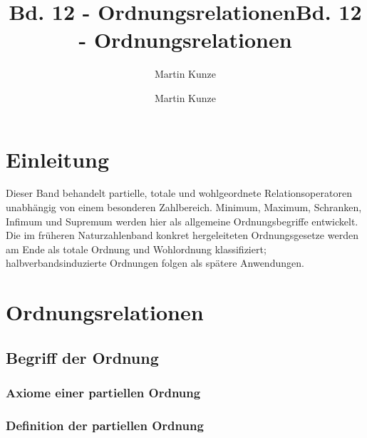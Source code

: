 \documentclass[main.tex]{subfiles}
\title{Bd. 12 - Ordnungsrelationen}
\author{Martin Kunze}
\date{}
\begin{document}
\title{Bd. 12 - Ordnungsrelationen}
\author{Martin Kunze}
\date{}
\hypersetup{pageanchor=false}
\maketitle
\hypersetup{pageanchor=true}
\setcounter{tocdepth}{3}
\tableofcontents
\setcounter{file}{12}
\renewcommand{\FormulaBandID}{12}
\providecommand{\ProofRefStack}[1]{%
  \ensuremath{\begin{gathered}#1\end{gathered}}}

\chapter{Einleitung}

Dieser Band behandelt partielle, totale und wohlgeordnete Relationsoperatoren
unabhängig von einem besonderen Zahlbereich. Minimum, Maximum, Schranken,
Infimum und Supremum werden hier als allgemeine Ordnungsbegriffe entwickelt.
Die im früheren Naturzahlenband konkret hergeleiteten Ordnungsgesetze werden
am Ende als totale Ordnung und Wohlordnung klassifiziert;
halbverbandsinduzierte Ordnungen folgen als spätere Anwendungen.

\chapter{Ordnungsrelationen}

\section{Begriff der Ordnung}

\subsection{Axiome einer partiellen Ordnung}


\subsection{Definition der partiellen Ordnung}

\end{document}
